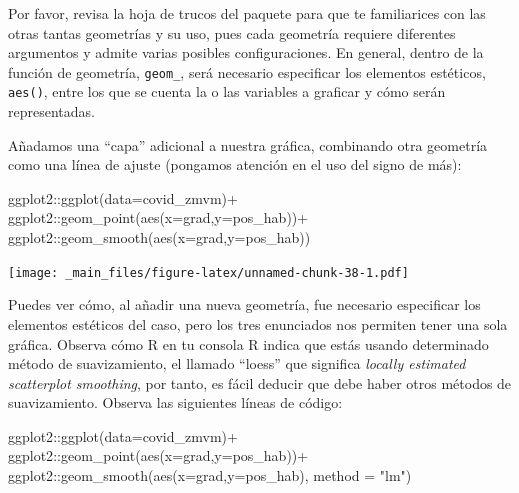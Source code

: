 \documentclass[
  11pt,
  oneside]{book}
\newenvironment{Shaded}{\begin{snugshade}}{\end{snugshade}}
\newcommand{\AttributeTok}[1]{\textcolor[rgb]{0.77,0.63,0.00}{#1}}
\newcommand{\FunctionTok}[1]{\textcolor[rgb]{0.00,0.00,0.00}{#1}}
\newcommand{\NormalTok}[1]{#1}
\newcommand{\SpecialCharTok}[1]{\textcolor[rgb]{0.00,0.00,0.00}{#1}}
\newcommand{\StringTok}[1]{\textcolor[rgb]{0.31,0.60,0.02}{#1}}
\begin{document}
Por favor, revisa la hoja de trucos del paquete para que te familiarices con las otras tantas geometrías y su uso, pues cada geometría requiere diferentes argumentos y admite varias posibles configuraciones. En general, dentro de la función de geometría, \texttt{geom\_}, será necesario especificar los elementos estéticos, \texttt{aes()}, entre los que se cuenta la o las variables a graficar y cómo serán representadas.

Añadamos una ``capa'' adicional a nuestra gráfica, combinando otra geometría como una línea de ajuste (pongamos atención en el uso del signo de más):

\begin{Shaded}
\begin{Highlighting}[]
\NormalTok{ggplot2}\SpecialCharTok{::}\FunctionTok{ggplot}\NormalTok{(}\AttributeTok{data=}\NormalTok{covid\_zmvm)}\SpecialCharTok{+}
\NormalTok{  ggplot2}\SpecialCharTok{::}\FunctionTok{geom\_point}\NormalTok{(}\FunctionTok{aes}\NormalTok{(}\AttributeTok{x=}\NormalTok{grad,}\AttributeTok{y=}\NormalTok{pos\_hab))}\SpecialCharTok{+}
\NormalTok{  ggplot2}\SpecialCharTok{::}\FunctionTok{geom\_smooth}\NormalTok{(}\FunctionTok{aes}\NormalTok{(}\AttributeTok{x=}\NormalTok{grad,}\AttributeTok{y=}\NormalTok{pos\_hab))}
\end{Highlighting}
\end{Shaded}

\texttt{[image: \_main\_files/figure-latex/unnamed-chunk-38-1.pdf]}

Puedes ver cómo, al añadir una nueva geometría, fue necesario especificar los elementos estéticos del caso, pero los tres enunciados nos permiten tener una sola gráfica. Observa cómo R en tu consola R indica que estás usando determinado método de suavizamiento, el llamado ``loess'' que significa \emph{locally estimated scatterplot smoothing}, por tanto, es fácil deducir que debe haber otros métodos de suavizamiento. Observa las siguientes líneas de código:

\begin{Shaded}
\begin{Highlighting}[]
\NormalTok{ggplot2}\SpecialCharTok{::}\FunctionTok{ggplot}\NormalTok{(}\AttributeTok{data=}\NormalTok{covid\_zmvm)}\SpecialCharTok{+}
\NormalTok{  ggplot2}\SpecialCharTok{::}\FunctionTok{geom\_point}\NormalTok{(}\FunctionTok{aes}\NormalTok{(}\AttributeTok{x=}\NormalTok{grad,}\AttributeTok{y=}\NormalTok{pos\_hab))}\SpecialCharTok{+}
\NormalTok{  ggplot2}\SpecialCharTok{::}\FunctionTok{geom\_smooth}\NormalTok{(}\FunctionTok{aes}\NormalTok{(}\AttributeTok{x=}\NormalTok{grad,}\AttributeTok{y=}\NormalTok{pos\_hab), }\AttributeTok{method =} \StringTok{"lm"}\NormalTok{)}
\end{Highlighting}
\end{Shaded}
\end{document}
